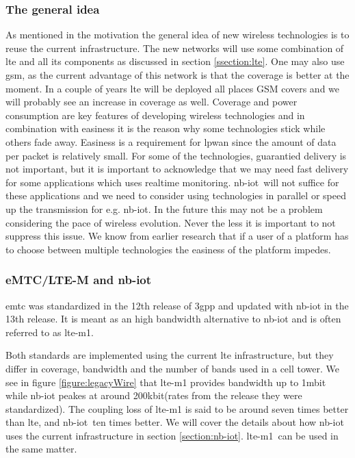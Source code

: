 \documentclass[USenglish]{ifimaster}  %
\begin{document}
\subsubsection{The general idea}
As mentioned in the motivation the general idea of new wireless technologies is to reuse the current infrastructure. The new networks will use some combination of \acrshort{lte} and all its components as discussed in section \vref{ssection:lte}. One may also use \acrshort{gsm}, as the current advantage of this network is that the coverage is better at the moment. In a couple of years \acrshort{lte} will be deployed all places GSM covers and we will probably see an increase in coverage as well. Coverage and power consumption are key features of developing wireless technologies and in combination with easiness it is the reason why some technologies stick while others fade away. Easiness is a requirement for \acrshort{lpwan} since the amount of data per packet is relatively small. For some of the technologies, guarantied delivery is not important, but it is important to acknowledge that we may need fast delivery for some applications which uses realtime monitoring.
\acrshort{nb-iot} will not suffice for these applications and we need to consider using technologies in parallel or speed up the transmission for e.g. \acrshort{nb-iot}. In the future this may not be a problem considering the pace of wireless evolution. Never the less it is important to not suppress this issue. We know from earlier research that if a user of a platform has to choose between multiple technologies the easiness of the platform impedes.

\subsubsection{eMTC/LTE-M and \acrshort{nb-iot}}
\acrfull{emtc} was standardized in the 12th release of \acrshort{3gpp} and updated with \acrshort{nb-iot} in the 13th release. It is meant as an high bandwidth alternative to \acrshort{nb-iot} and is often referred to as \acrshort{lte-m1}.

Both standards are implemented using the current \acrshort{lte} infrastructure, but they differ in coverage, bandwidth and the number of bands used in a cell tower. We see in figure \vref{figure:legacyWire} that \acrshort{lte-m1} provides bandwidth up to 1\acrshort{mbit} while \acrshort{nb-iot} peakes at around 200\acrshort{kbit}(rates from the release they were standardized). The coupling loss of \acrshort{lte-m1} is said to be around seven times better than \acrshort{lte}, and \acrshort{nb-iot} ten times better. We will cover the details about how \acrshort{nb-iot} uses the current infrastructure in section \vref{section:nb-iot}. \acrshort{lte-m1} can be used in the same matter.
\end{document}
